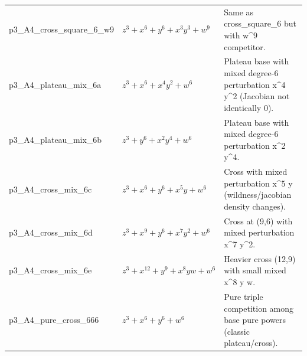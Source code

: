 \documentclass[11pt]{amsart}
\begin{document}
\begin{longtable}{@{}p{} p{} p{}@{}}
p3\_A4\_cross\_square\_6\_w9 & $z^{3} + x^{6} + y^{6} + x^{3}y^{3} + w^{9}$ & Same as cross\_square\_6 but with w\textasciicircum{}9 competitor. \\
p3\_A4\_plateau\_mix\_6a & $z^{3} + x^{6} + x^{4}y^{2} + w^{6}$ & Plateau base with mixed degree-6 perturbation x\textasciicircum{}4 y\textasciicircum{}2 (Jacobian not identically 0). \\
p3\_A4\_plateau\_mix\_6b & $z^{3} + y^{6} + x^{2}y^{4} + w^{6}$ & Plateau base with mixed degree-6 perturbation x\textasciicircum{}2 y\textasciicircum{}4. \\
p3\_A4\_cross\_mix\_6c & $z^{3} + x^{6} + y^{6} + x^{5}y + w^{6}$ & Cross with mixed perturbation x\textasciicircum{}5 y (wildness/jacobian density changes). \\
p3\_A4\_cross\_mix\_6d & $z^{3} + x^{9} + y^{6} + x^{7}y^{2} + w^{6}$ & Cross at (9,6) with mixed perturbation x\textasciicircum{}7 y\textasciicircum{}2. \\
p3\_A4\_cross\_mix\_6e & $z^{3} + x^{12} + y^{9} + x^{8}yw + w^{6}$ & Heavier cross (12,9) with small mixed x\textasciicircum{}8 y w. \\
p3\_A4\_pure\_cross\_666 & $z^{3} + x^{6} + y^{6} + w^{6}$ & Pure triple competition among base pure powers (classic plateau/cross). \\
\bottomrule
\end{longtable}
\end{document}

